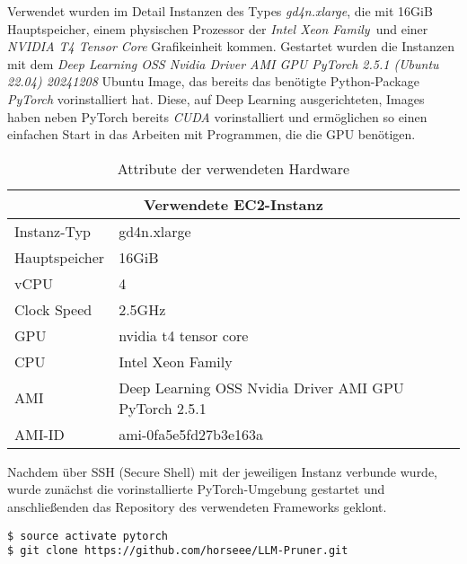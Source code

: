 Verwendet wurden im Detail Instanzen des Types \emph{gd4n.xlarge}, die mit 16GiB
Hauptspeicher, einem physischen Prozessor der \emph{Intel Xeon Family} und einer
\emph{NVIDIA T4 Tensor Core} Grafikeinheit kommen. Gestartet wurden die
Instanzen mit dem \emph{Deep Learning OSS Nvidia Driver AMI GPU PyTorch 2.5.1
	(Ubuntu 22.04) 20241208} Ubuntu Image, das bereits das benötigte Python-Package
\emph{PyTorch} vorinstalliert hat. Diese, auf Deep Learning ausgerichteten,
Images haben neben PyTorch bereits \emph{CUDA} vorinstalliert und ermöglichen so
einen einfachen Start in das Arbeiten mit Programmen, die die GPU benötigen.

\begin{table}[ht!]
	\centering
	\begin{tabular}{|p{3cm}|p{12cm}|}
		\hline
		\multicolumn{2}{|c|}{\textbf{Verwendete EC2-Instanz}}                 \\
		\hline
		Instanz-Typ   & gd4n.xlarge                                           \\
		\hline
		Hauptspeicher & 16GiB                                                 \\
		\hline
		vCPU          & 4                                                     \\
		\hline
		Clock Speed   & 2.5GHz                                                \\
		\hline
		GPU           & nvidia t4 tensor core                                 \\
		\hline
		CPU           & Intel Xeon Family                                     \\
		\hline
		AMI           & Deep Learning OSS Nvidia Driver AMI GPU PyTorch 2.5.1 \\
		\hline
		AMI-ID        & ami-0fa5e5fd27b3e163a                                 \\
		\hline
	\end{tabular}
	\caption{Attribute der verwendeten Hardware}
\end{table}

Nachdem über SSH (Secure Shell) mit der jeweiligen Instanz verbunde wurde,
wurde zunächst die vorinstallierte PyTorch-Umgebung gestartet und
anschließenden das Repository des verwendeten Frameworks geklont.

\vspace{1em}
\begin{lstlisting}
$ source activate pytorch
$ git clone https://github.com/horseee/LLM-Pruner.git
\end{lstlisting}

